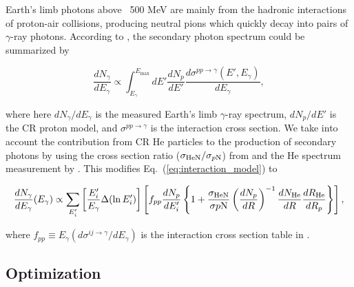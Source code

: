 Earth's limb photons above ~500 MeV are mainly from the hadronic
interactions of proton-air collisions, producing neutral pions
which quickly decay into pairs of $\gamma$-ray photons. According to \cite{K&Omodel},
the secondary photon spectrum could be summarized by

\begin{equation}
    \frac{dN_\gamma}{dE_\gamma}\propto \int^{E_{\text{max}}}_{E_\gamma} dE'\frac{dN_p}{dE'} \frac{d\sigma^{pp\rightarrow\gamma}(E',E_\gamma)}{dE_\gamma}
    ,\label{eq:interaction_model}
\end{equation}

where here $dN_\gamma/dE_\gamma$ is the measured Earth's limb $\gamma$-ray spectrum,
$dN_p/dE'$ is the CR proton model, and $\sigma^{pp\rightarrow\gamma}$ is the interaction
cross section.
We take into account the contribution from CR He particles to the production of secondary
photons by using the cross section ratio ($\sigma_{\rm HeN}/\sigma_{p\rm N}$) from
\cite{WAtwater} and the He spectrum measurement by \cite{AMS-02Helium}. This modifies
Eq.~(\ref{eq:interaction_model}) to

\begin{equation}
    \frac{dN_{\gamma}}{dE_\gamma}(E_\gamma) \propto
    \sum_{E'_i}\left[\frac{E'_i}{E_{\gamma}}\Delta(\ln E'_i) \right]
    \left[ 
        f_{pp}\frac{dN_p}{dE'_i}
        \left\{
            1+\frac{\sigma_{\text{HeN}}}{\sigma{p\rm N}}\left(\frac{dN_p}{dR}\right)^{-1} \frac{dN_{\text{He}}}{dR} \frac{dR_{\text{He}}}{dR_p} 
        \right\}
    \right]
    ,\label{eq:derived_model}
\end{equation}

where $f_{pp} \equiv E_\gamma(d\sigma^{ij\rightarrow\gamma}/dE_\gamma)$
is the interaction cross section table in \cite{K&Omodel}.

\subsection{Optimization}

